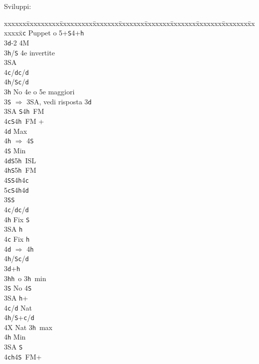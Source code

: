 \documentclass[a4paper,italian]{article}
\newcommand{\BS}{\small{\texttt{S}}}
\newcommand{\BC}{\small{\texttt{c}}}
\newcommand{\BD}{\small{\texttt{d}}}
\newcommand{\BH}{\small{\texttt{h}}}
\newenvironment{bidtable}
{\begin{tabbing}

    xxxxxx\=xxxxxxxxx\=xxxxxxxxx\=xxxxxxx\=xxxxxxx\=xxxxxxx\=xxxxxxx\=xxxxxxx\=xxxxxxx\=xxxxxxx\=\kill}
{\end{tabbing} }%
\begin{document}
\begin{multicols}{2}
    Sviluppi:

    \begin{bidtable}
        3\BC \> Puppet o 5+\BS 4+\BH \+\\
        3\BD {}-2 4M\+\\
        3\BH/\BS \> 4e invertite\+\\
        3\small{SA}\+\\
        4\BC/\BD {}\BC /\BD \\
        4\BH/\BS {}\BC /\BD \-\-\-\\
        3\BH \> No 4e o 5e maggiori\+\\
        3\BS \> $\Rightarrow$ 3\small{SA}, vedi risposta 3\BD\\
        3\small{SA} \BS 4\BH\ FM\\
        4\BC {}\BS 4\BH\ FM +\+\\
        4\BD \> Max\+\\
        4\BH \> $\Rightarrow$ 4\BS \-\\
        4\BS \> Min\-\\
        4\BD {}\BS 5\BH\ ISL\\
        4\BH {}\BS 5\BH\ FM\\
        4\BS {}\BS 4\BH 4\BC \\
        5\BC {}\BS 4\BH 4\BD \-\\
        3\BS {}\BS \+\\
        4\BC/\BD {}\BC /\BD \\
        4\BH \> Fix \BS \-\\
        3\small{SA} \BH \+\\
        4\BC \> Fix \BH \\
        4\BD \> $\Rightarrow$ 4\BH \\
        4\BH/\BS {}\BC /\BD \-\-\\
        3\BD {}+\BH \+\\
        3\BH {}\BH\ o 3\BH\ min\+\\
        3\BS \> No 4\BS \+\\
        3\small{SA} \BH +\+\\
        4\BC/\BD \> Nat\\
        4\BH/\BS {}+\BC /\BD \-\\
        4X \> Nat 3\BH\ max\\
        4\BH \> Min\-\\
        3\small{SA} \BS \\
        4\BC {}\BH 4\BS\ FM+\\

\end{bidtable}
\end{multicols}
\end{document}
